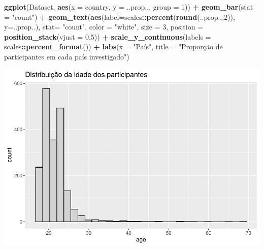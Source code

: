 \documentclass[
]{book}
\newenvironment{Shaded}{\begin{snugshade}}{\end{snugshade}}
\newcommand{\DataTypeTok}[1]{\textcolor[rgb]{0.13,0.29,0.53}{#1}}
\newcommand{\DecValTok}[1]{\textcolor[rgb]{0.00,0.00,0.81}{#1}}
\newcommand{\FloatTok}[1]{\textcolor[rgb]{0.00,0.00,0.81}{#1}}
\newcommand{\KeywordTok}[1]{\textcolor[rgb]{0.13,0.29,0.53}{\textbf{#1}}}
\newcommand{\NormalTok}[1]{#1}
\newcommand{\OperatorTok}[1]{\textcolor[rgb]{0.81,0.36,0.00}{\textbf{#1}}}
\newcommand{\StringTok}[1]{\textcolor[rgb]{0.31,0.60,0.02}{#1}}
\begin{document}
\begin{Shaded}
\begin{Highlighting}[]
\KeywordTok{ggplot}\NormalTok{(Dataset, }\KeywordTok{aes}\NormalTok{(}\DataTypeTok{x =}\NormalTok{ country, }\DataTypeTok{y =}\NormalTok{ ..prop.., }\DataTypeTok{group =} \DecValTok{1}\NormalTok{)) }\OperatorTok{+}\StringTok{ }
\StringTok{  }\KeywordTok{geom_bar}\NormalTok{(}\DataTypeTok{stat =} \StringTok{"count"}\NormalTok{) }\OperatorTok{+}
\StringTok{  }\KeywordTok{geom_text}\NormalTok{(}\KeywordTok{aes}\NormalTok{(}\DataTypeTok{label=}\NormalTok{scales}\OperatorTok{::}\KeywordTok{percent}\NormalTok{(}\KeywordTok{round}\NormalTok{(..prop..,}\DecValTok{2}\NormalTok{)), }
                \DataTypeTok{y=}\NormalTok{..prop..), }
            \DataTypeTok{stat=} \StringTok{"count"}\NormalTok{, }\DataTypeTok{color =} \StringTok{"white"}\NormalTok{, }
            \DataTypeTok{size =} \DecValTok{3}\NormalTok{, }\DataTypeTok{position =} \KeywordTok{position_stack}\NormalTok{(}\DataTypeTok{vjust =} \FloatTok{0.5}\NormalTok{)) }\OperatorTok{+}
\StringTok{  }\KeywordTok{scale_y_continuous}\NormalTok{(}\DataTypeTok{labels =}\NormalTok{ scales}\OperatorTok{::}\KeywordTok{percent_format}\NormalTok{()) }\OperatorTok{+}
\StringTok{  }\KeywordTok{labs}\NormalTok{(}\DataTypeTok{x =} \StringTok{"País"}\NormalTok{,}
       \DataTypeTok{title =} 
         \StringTok{"Proporção de participantes em cada país investigado"}\NormalTok{)}
\end{Highlighting}
\end{Shaded}

\begin{center}\includegraphics{gitbook-demo_files/figure-latex/unnamed-chunk-16-1} \end{center}
\end{document}
